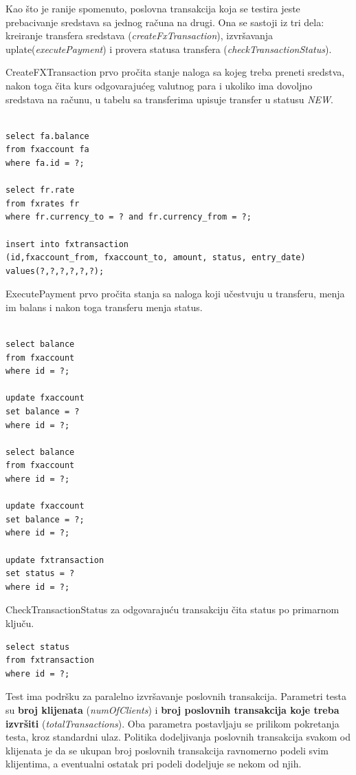 \documentclass[12pt,oneside]{memoir}
\begin{document}
Kao što je ranije spomenuto, poslovna transakcija koja se testira jeste prebacivanje sredstava sa jednog računa na drugi.  Ona se sastoji iz tri dela: kreiranje transfera sredstava (\textit{createFxTransaction}), izvršavanja uplate(\textit{executePayment}) i provera 
statusa transfera (\textit{checkTransactionStatus}).

CreateFXTransaction prvo pročita stanje naloga sa kojeg treba preneti sredstva, nakon toga čita kurs odgovarajućeg valutnog para i ukoliko ima dovoljno sredstava na računu, u tabelu sa transferima upisuje transfer u statusu \textit{NEW}.

\pagebreak

\begin{lstlisting}[title={CreateFXTransaction},captionpos=t]

select fa.balance
from fxaccount fa
where fa.id = ?;

select fr.rate
from fxrates fr
where fr.currency_to = ? and fr.currency_from = ?;

insert into fxtransaction
(id,fxaccount_from, fxaccount_to, amount, status, entry_date)
values(?,?,?,?,?,?);
\end{lstlisting}

ExecutePayment prvo pročita stanja sa naloga koji učestvuju u transferu, menja im balans i nakon toga transferu menja status.

\begin{lstlisting}[title={ExecutePayment},captionpos=t]

select balance
from fxaccount
where id = ?;

update fxaccount
set balance = ?
where id = ?;

select balance
from fxaccount
where id = ?;

update fxaccount
set balance = ?;
where id = ?;

update fxtransaction
set status = ?
where id = ?;

\end{lstlisting}
\pagebreak
CheckTransactionStatus za odgovarajuću transakciju čita status po primarnom ključu.


\begin{lstlisting}[title={CheckTransactionStatus},captionpos=t]
select status
from fxtransaction
where id = ?;
\end{lstlisting}


Test ima podršku za paralelno izvršavanje poslovnih transakcija. Parametri testa su \textbf{broj klijenata} (\textit{numOfClients}) i \textbf{broj poslovnih transakcija koje treba izvršiti} (\textit{totalTransactions}). Oba parametra postavljaju se prilikom pokretanja testa, kroz standardni ulaz. Politika dodeljivanja poslovnih transakcija svakom od klijenata je da se ukupan broj poslovnih transakcija ravnomerno podeli svim klijentima, a eventualni ostatak pri podeli dodeljuje se nekom od njih.
\end{document}
